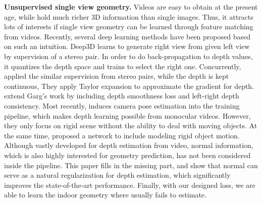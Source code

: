 \textbf{Unsupervised single view geometry.}
Videos are easy to obtain at the present age, while hold much richer 3D information than single images. Thus, it attracts lots of interests if single view geometry can be learned through feature matching from videos. Recently, several deep learning methods have been proposed based on such an intuition. Deep3D \cite{xie2016deep3d} learns to generate right view from given left view by supervision of a stereo pair. In order to do back-propagation to depth values, it quantizes the depth space and trains to select the right one. 
Concurrently, \cite{GargBR16} applied the similar supervision from stereo pairs, while the depth is kept continuous, They apply Taylor expansion to approximate the gradient for depth. \cite{godard2016unsupervised} extend Garg's work by including depth smoothness loss and left-right depth consistency. Most recently, \cite{zhou2017unsupervised} induces camera pose estimation into the training pipeline, which makes depth learning possible from monocular videos. However, they only focus on rigid scene without the ability to deal with moving objects. At the same time, \cite{kuznietsov2017semi} proposed a network to include modeling rigid object motion. Although vastly developed for depth estimation from video, normal information, which is also highly interested for geometry prediction, has not been considered inside the pipeline. This paper fills in the missing part, and show that normal can serve as a natural regularization for depth estimation, which significantly improves the state-of-the-art performance. Finally, with our designed loss, we are able to  learn the indoor geometry where \cite{zhou2017unsupervised} usually fails to estimate.

